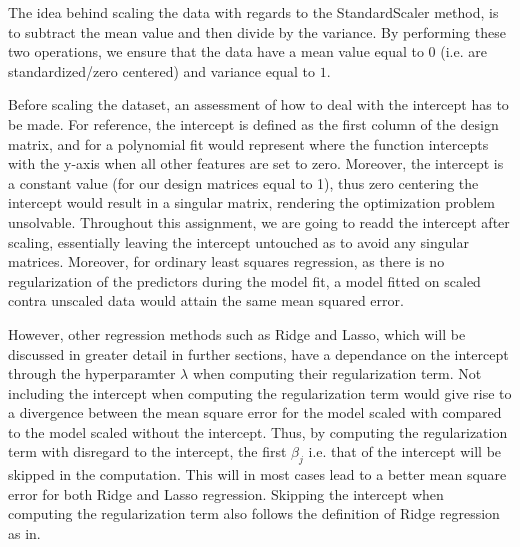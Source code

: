 \documentclass[11pt, a4paper]{article}
\begin{document}
The idea behind scaling the data with regards to the StandardScaler method, is to subtract the mean value and then divide by the variance. By performing these two operations, we ensure that the data have a mean value equal to $0$ (i.e. are standardized/zero centered) and variance equal to $1$. 

Before scaling the dataset, an assessment of how to deal with the intercept has to be made. For reference, the intercept is defined as the first column of the design matrix, and for a polynomial fit would represent where the function intercepts with the y-axis when all other features are set to zero. Moreover, the intercept is a constant value (for our design matrices equal to 1), thus zero centering the intercept would result in a singular matrix, rendering the optimization problem unsolvable. Throughout this assignment, we are going to readd the intercept after scaling, essentially leaving the intercept untouched as to avoid any singular matrices. Moreover, for ordinary least squares regression, as there is no regularization of the predictors during the model fit, a model fitted on scaled contra unscaled data would attain the same mean squared error.

However, other regression methods such as Ridge and Lasso, which will be discussed in greater detail in further sections, have a dependance on the intercept through the hyperparamter $\lambda$ when computing their regularization term. Not including the intercept when computing the regularization term would give rise to a divergence between the mean square error for the model scaled with compared to the model scaled without the intercept. Thus, by computing the regularization term with disregard to the intercept, the first $\beta_j$ i.e. that of the intercept will be skipped in the computation. This will in most cases lead to a better mean square error for both Ridge and Lasso regression. Skipping the intercept when computing the regularization term also follows the definition of Ridge regression as in. \cite{Geron2019}
\end{document}
